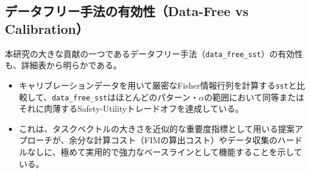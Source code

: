 \documentclass{article}
\begin{document}
\subsection{データフリー手法の有効性（Data-Free vs Calibration）}
本研究の大きな貢献の一つであるデータフリー手法（\texttt{data\_free\_sst}）の有効性も、詳細表から明らかである。
\begin{itemize}
    \item キャリブレーションデータを用いて厳密なFisher情報行列を計算する\texttt{sst}と比較して、\texttt{data\_free\_sst}はほとんどのパターン・$\alpha$の範囲において同等またはそれに肉薄するSafety-Utilityトレードオフを達成している。
    \item これは、タスクベクトルの大きさを近似的な重要度指標として用いる提案アプローチが、余分な計算コスト（FIMの算出コスト）やデータ収集のハードルなしに、極めて実用的で強力なベースラインとして機能することを示している。
\end{itemize}

\newpage

\end{document}
